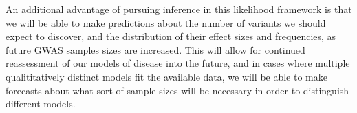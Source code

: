 \documentclass[11pt]{article}
\begin{document}
An additional advantage of pursuing inference in this likelihood framework is that we will be able to make predictions about the number of variants we should expect to discover, and the distribution of their effect sizes and frequencies, as future GWAS samples sizes are increased. This will allow for continued reassessment of our models of disease into the future, and in cases where multiple qualititatively distinct models fit the available data, we will be able to make forecasts about what sort of sample sizes will be necessary in order to distinguish different models.  



\end{document}
